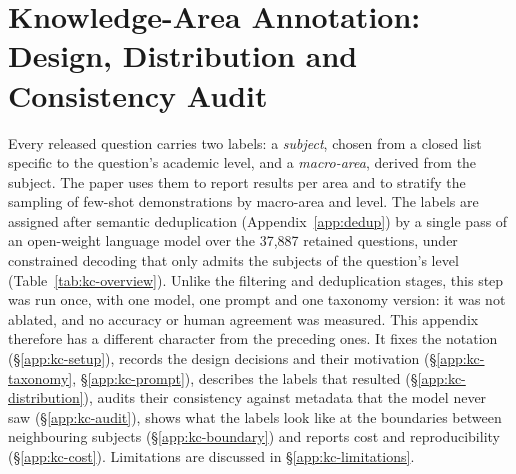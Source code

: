 %
%
\providecommand{\KnowledgeFigDir}{figures}

\section{Knowledge-Area Annotation: Design, Distribution and Consistency Audit}
\label{app:kc}

Every released question carries two labels: a \emph{subject}, chosen from a
closed list specific to the question's academic level, and a
\emph{macro-area}, derived from the subject. The paper uses them to report
results per area and to stratify the sampling of few-shot demonstrations by
macro-area and level. The labels are assigned after semantic deduplication
(Appendix~\ref{app:dedup}) by a single pass of an open-weight language model
over the 37,887 retained questions, under constrained decoding that only
admits the subjects of the question's level (Table~\ref{tab:kc-overview}).
Unlike the filtering and deduplication stages, this step was run once, with
one model, one prompt and one taxonomy version: it was not ablated, and no
accuracy or human agreement was measured. This appendix therefore has a
different character from the preceding ones. It fixes the notation
(\S\ref{app:kc-setup}), records the design decisions and their motivation
(\S\ref{app:kc-taxonomy}, \S\ref{app:kc-prompt}), describes the labels that
resulted (\S\ref{app:kc-distribution}), audits their consistency against
metadata that the model never saw (\S\ref{app:kc-audit}), shows what the
labels look like at the boundaries between neighbouring subjects
(\S\ref{app:kc-boundary}) and reports cost and reproducibility
(\S\ref{app:kc-cost}). Limitations are discussed in
\S\ref{app:kc-limitations}.

